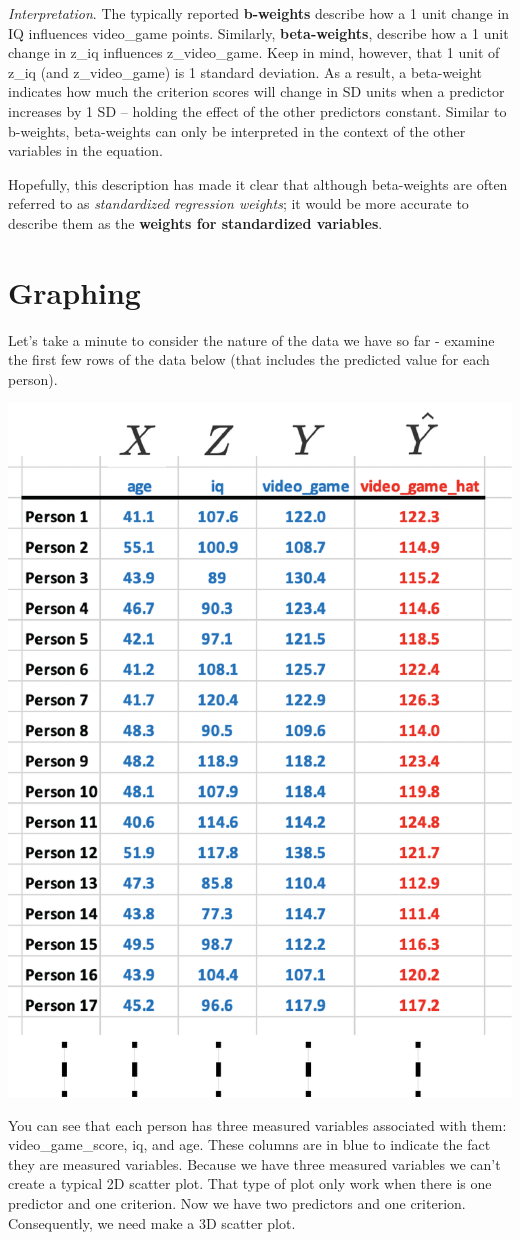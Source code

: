 \documentclass[
]{krantz}
\begin{document}
\emph{Interpretation}. The typically reported \textbf{b-weights} describe how a 1 unit change in IQ influences video\_game points. Similarly, \textbf{beta-weights}, describe how a 1 unit change in z\_iq influences z\_video\_game. Keep in mind, however, that 1 unit of z\_iq (and z\_video\_game) is 1 standard deviation. As a result, a beta-weight indicates how much the criterion scores will change in SD units when a predictor increases by 1 SD -- holding the effect of the other predictors constant. Similar to b-weights, beta-weights can only be interpreted in the context of the other variables in the equation.

Hopefully, this description has made it clear that although beta-weights are often referred to as \emph{standardized regression weights}; it would be more accurate to describe them as the \textbf{weights for standardized variables}.

\hypertarget{graphing-2}{%
\section{Graphing}\label{graphing-2}}

Let's take a minute to consider the nature of the data we have so far - examine the first few rows of the data below (that includes the predicted value for each person).

\includegraphics[width=0.5\linewidth]{ch_multiple_regression/images/mr_reg_data_figure}

You can see that each person has three measured variables associated with them: video\_game\_score, iq, and age. These columns are in blue to indicate the fact they are measured variables. Because we have three measured variables we can't create a typical 2D scatter plot. That type of plot only work when there is one predictor and one criterion. Now we have two predictors and one criterion. Consequently, we need make a 3D scatter plot.
\end{document}
